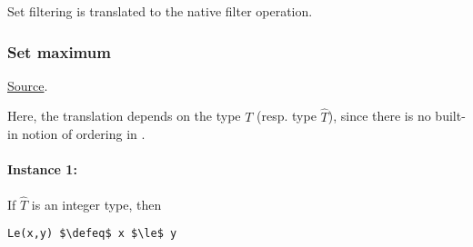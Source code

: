 \begin{mathpar}
\end{mathpar}
Set filtering is translated to the \tlap native filter operation.

\subsubsection{ Set maximum}
\href{https://github.com/saltiniroberto/ssf/blob/7ea6e18093d9da3154b4e396dd435549f687e6b9/high_level/common/pythonic_code_generic.py#L74-L76}{Source}.



\begin{mathpar}
\end{mathpar}
Here, the translation depends on the type $T$ (resp. type $\hat{T}$), since there is no built-in notion of ordering in \tlap{}. 
\paragraph{Instance 1:} If $\hat{T}$ is an integer type, then 
\begin{lstlisting}[language=tla,columns=fullflexible]
Le(x,y) $\defeq$ x $\le$ y
\end{lstlisting}
